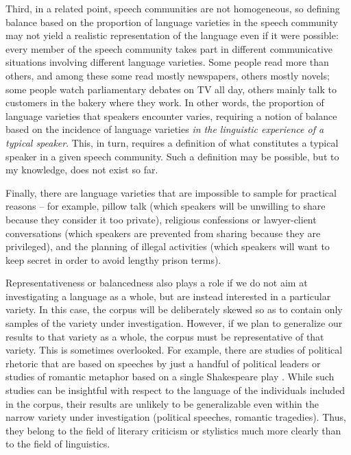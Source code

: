 Third, in a related point, speech communities are not homogeneous, so defining balance based on the proportion of language varieties  in the speech community may not yield a realistic representation of the language even if it were possible: every member of the speech community takes part in different communicative situations involving different language varieties. Some people read more than others, and among these some read mostly newspapers,  others mostly novels;  some people watch parliamentary debates on TV all day, others mainly talk to customers in the bakery where they work. In other words, the proportion of language varieties  that speakers encounter varies, requiring a notion of balance based on the incidence of language varieties \emph{in the linguistic experience of a typical speaker}. This, in turn, requires a definition of what constitutes a typical speaker in a given speech community. Such a definition may be possible, but to my knowledge, does not exist so far.

Finally, there are language varieties  that are impossible to sample  for practical reasons -- for example, pillow talk (which speakers will be unwilling to share because they consider it too private), religious confessions or lawyer\hyp{}client conversations  (which speakers are prevented from sharing because they are privileged), and the planning of illegal activities (which speakers will want to keep secret in order to avoid lengthy prison terms).

Representativeness or balancedness also plays a role if we do not aim at investigating a language as a whole, but are instead interested in a particular variety.  In this case, the corpus will be deliberately skewed so as to contain only samples  of the variety under investigation. However, if we plan to generalize our results to that variety as a whole, the corpus must be representative  of that variety. This is sometimes overlooked. For example, there are studies of political rhetoric that are based on speeches by just a handful of political leaders \citep[cf., e.g.,][]{charteris-black_britain_2006,charteris-black_politicians_2005} or studies of romantic metaphor  based on a single Shakespeare play \citep{barcelona_sanchez_metaphorical_1995}. While such studies can be insightful with respect to the language of the individuals included in the corpus, their results are unlikely to be generalizable even within the narrow variety  under investigation (political speeches, romantic tragedies). Thus, they belong to the field of literary  criticism or stylistics much more clearly than to the field of linguistics.

